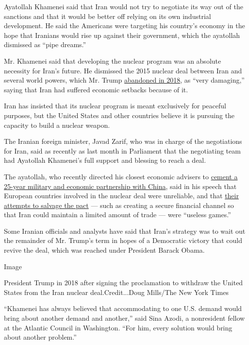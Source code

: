 Ayatollah Khamenei said that Iran would not try to negotiate its way out
of the sanctions and that it would be better off relying on its own
industrial development. He said the Americans were targeting his
country's economy in the hope that Iranians would rise up against their
government, which the ayatollah dismissed as ``pipe dreams.''

Mr. Khamenei said that developing the nuclear program was an absolute
necessity for Iran's future. He dismissed the 2015 nuclear deal between
Iran and several world powers, which Mr. Trump
\href{https://www.nytimes3xbfgragh.onion/2018/05/08/world/middleeast/trump-iran-nuclear-deal.html}{abandoned
in 2018}, as ``very damaging,'' saying that Iran had suffered economic
setbacks because of it.

Iran has insisted that its nuclear program is meant exclusively for
peaceful purposes, but the United States and other countries believe it
is pursuing the capacity to build a nuclear weapon.

The Iranian foreign minister, Javad Zarif, who was in charge of the
negotiations for Iran, said as recently as last month in Parliament that
the negotiating team had Ayatollah Khamenei's full support and blessing
to reach a deal.

The ayatollah, who recently directed his closest economic advisers to
\href{https://www.nytimes3xbfgragh.onion/2020/07/11/world/asia/china-iran-trade-military-deal.html}{cement
a 25-year military and economic partnership with China}, said in his
speech that European countries involved in the nuclear deal were
unreliable, and that
\href{https://www.nytimes3xbfgragh.onion/2020/01/15/world/europe/europe-iran-nuclear-deal.html}{their
attempts to salvage the pact} --- such as creating a secure financial
channel so that Iran could maintain a limited amount of trade --- were
``useless games.''

Some Iranian officials and analysts have said that Iran's strategy was
to wait out the remainder of Mr. Trump's term in hopes of a Democratic
victory that could revive the deal, which was reached under President
Barack Obama.

Image

President Trump in 2018 after signing the proclamation to withdraw the
United States from the Iran nuclear deal.Credit...Doug Mills/The New
York Times

``Khamenei has always believed that accommodating to one U.S. demand
would bring about another demand and another,'' said Sina Azodi, a
nonresident fellow at the Atlantic Council in Washington. ``For him,
every solution would bring about another problem.''

